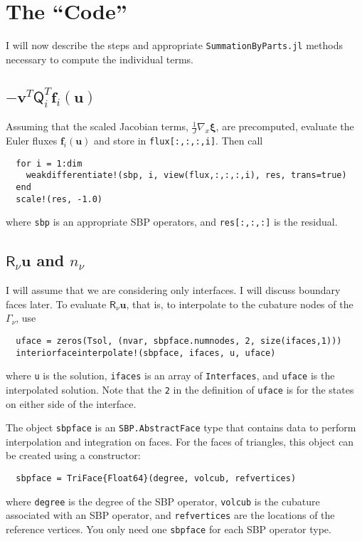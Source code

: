 \documentclass[11pt]{article} %
\newcommand{\mat}[1]{\ensuremath{\mathsf{#1}}}
\newcommand{\Q}[1]{\mat{Q}_{#1}}
\newcommand{\R}[0]{\mat{R}}
\begin{document}
\newpage

\section*{The ``Code''}

I will now describe the steps and appropriate \texttt{SummationByParts.jl}
methods necessary to compute the individual terms.

\subsection*{$-\bm{v}^{T} \Q{i}^{T} \bm{f}_{i}(\bm{u})$}

Assuming that the scaled Jacobian terms, $\frac{1}{J}\nabla_x \boldsymbol{\xi}$,
are precomputed, evaluate the Euler fluxes $\bm{f}_{i}(\bm{u})$ and store in
\texttt{flux[:,:,:,i]}.  Then call
\begin{lstlisting}
  for i = 1:dim
    weakdifferentiate!(sbp, i, view(flux,:,:,:,i), res, trans=true)
  end
  scale!(res, -1.0)
\end{lstlisting}
where \texttt{sbp} is an appropriate SBP operators, and \texttt{res[:,:,:]} is
the residual.

\subsection*{$\R_{\nu} \bm{u}$ and $n_{\nu}$}

I will assume that we are considering only interfaces.  I will discuss boundary
faces later.  To evaluate $\R_{\nu} \bm{u}$, that is, to interpolate to the
cubature nodes of the $\Gamma_{\nu}$, use
\begin{lstlisting}
  uface = zeros(Tsol, (nvar, sbpface.numnodes, 2, size(ifaces,1)))
  interiorfaceinterpolate!(sbpface, ifaces, u, uface)
\end{lstlisting}
where \texttt{u} is the solution, \texttt{ifaces} is an array of
\texttt{Interfaces}, and \texttt{uface} is the interpolated solution.  Note that
the \texttt{2} in the definition of \texttt{uface} is for the states on either
side of the interface.

The object \texttt{sbpface} is an \texttt{SBP.AbstractFace} type that contains
data to perform interpolation and integration on faces.  For the faces of
triangles, this object can be created using a constructor:
\begin{lstlisting}
  sbpface = TriFace{Float64}(degree, volcub, refvertices)
\end{lstlisting}
where \texttt{degree} is the degree of the SBP operator, \texttt{volcub} is the
cubature associated with an SBP operator, and \texttt{refvertices} are the
locations of the reference vertices.  You only need one \texttt{sbpface} for
each SBP operator type.
\end{document}
